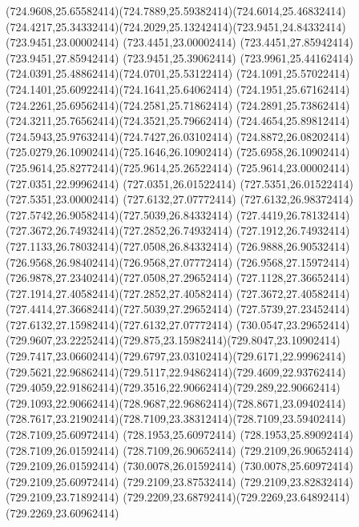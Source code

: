 {{	\curveto(724.9608,25.65582414)(724.7889,25.59382414)(724.6014,25.46832414)
	\curveto(724.4217,25.34332414)(724.2029,25.13242414)(723.9451,24.84332414)
	\lineto(723.9451,23.00002414)
	\lineto(723.4451,23.00002414)
	\lineto(723.4451,27.85942414)
	\lineto(723.9451,27.85942414)
	\lineto(723.9451,25.39062414)
	\curveto(723.9961,25.44162414)(724.0391,25.48862414)(724.0701,25.53122414)
	\curveto(724.1091,25.57022414)(724.1401,25.60922414)(724.1641,25.64062414)
	\curveto(724.1951,25.67162414)(724.2261,25.69562414)(724.2581,25.71862414)
	\curveto(724.2891,25.73862414)(724.3211,25.76562414)(724.3521,25.79662414)
	\curveto(724.4654,25.89812414)(724.5943,25.97632414)(724.7427,26.03102414)
	\curveto(724.8872,26.08202414)(725.0279,26.10902414)(725.1646,26.10902414)
	\curveto(725.6958,26.10902414)(725.9614,25.82772414)(725.9614,25.26522414)
	\lineto(725.9614,23.00002414)
	\closepath
	\moveto(727.0351,22.99962414)
	\lineto(727.0351,26.01522414)
	\lineto(727.5351,26.01522414)
	\lineto(727.5351,23.00002414)
	\closepath
	\moveto(727.6132,27.07772414)
	\curveto(727.6132,26.98372414)(727.5742,26.90582414)(727.5039,26.84332414)
	\curveto(727.4419,26.78132414)(727.3672,26.74932414)(727.2852,26.74932414)
	\curveto(727.1912,26.74932414)(727.1133,26.78032414)(727.0508,26.84332414)
	\curveto(726.9888,26.90532414)(726.9568,26.98402414)(726.9568,27.07772414)
	\curveto(726.9568,27.15972414)(726.9878,27.23402414)(727.0508,27.29652414)
	\curveto(727.1128,27.36652414)(727.1914,27.40582414)(727.2852,27.40582414)
	\curveto(727.3672,27.40582414)(727.4414,27.36682414)(727.5039,27.29652414)
	\curveto(727.5739,27.23452414)(727.6132,27.15982414)(727.6132,27.07772414)
	\closepath
	\moveto(730.0547,23.29652414)
	\curveto(729.9607,23.22252414)(729.875,23.15982414)(729.8047,23.10902414)
	\curveto(729.7417,23.06602414)(729.6797,23.03102414)(729.6171,22.99962414)
	\curveto(729.5621,22.96862414)(729.5117,22.94862414)(729.4609,22.93762414)
	\curveto(729.4059,22.91862414)(729.3516,22.90662414)(729.289,22.90662414)
	\curveto(729.1093,22.90662414)(728.9687,22.96862414)(728.8671,23.09402414)
	\curveto(728.7617,23.21902414)(728.7109,23.38312414)(728.7109,23.59402414)
	\lineto(728.7109,25.60972414)
	\lineto(728.1953,25.60972414)
	\lineto(728.1953,25.89092414)
	\lineto(728.7109,26.01592414)
	\lineto(728.7109,26.90652414)
	\lineto(729.2109,26.90652414)
	\lineto(729.2109,26.01592414)
	\lineto(730.0078,26.01592414)
	\lineto(730.0078,25.60972414)
	\lineto(729.2109,25.60972414)
	\lineto(729.2109,23.87532414)
	\lineto(729.2109,23.82832414)
	\lineto(729.2109,23.71892414)
	\curveto(729.2209,23.68792414)(729.2269,23.64892414)(729.2269,23.60962414)
}}
